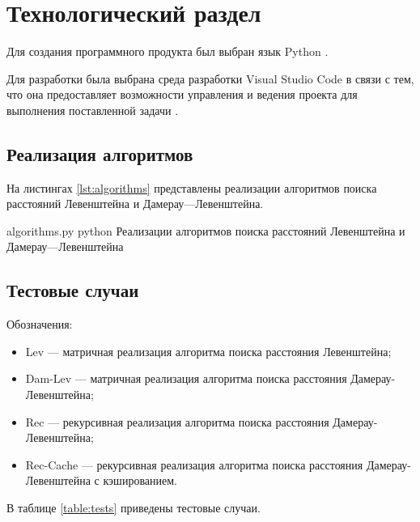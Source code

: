 \chapter{Технологический раздел}

Для создания программного продукта был выбран язык Python \cite{python}.

Для разработки была выбрана среда разработки Visual Studio Code в связи с тем, что она предоставляет возможности управления и ведения проекта для выполнения поставленной задачи \cite{vscode}.

\section{Реализация алгоритмов}

На листингах \ref{lst:algorithms} представлены реализации алгоритмов поиска расстояний Левенштейна и Дамерау---Левенштейна.

\newpage

{
    {algorithms.py}
    {python}
    {Реализации алгоритмов поиска расстояний Левенштейна и Дамерау---Левенштейна}
    \label{lst:algorithms}}

\newpage

\section{Тестовые случаи}

Обозначения:
\begin{itemize}
	\item Lev --- матричная реализация алгоритма поиска расстояния Левенштейна;
	\item Dam-Lev --- матричная реализация алгоритма поиска расстояния Дамерау-Левенштейна;
	\item Rec --- рекурсивная реализация алгоритма поиска расстояния Дамерау-Левенштейна;
	\item Rec-Cache --- рекурсивная реализация алгоритма поиска расстояния Дамерау-Левенштейна с кэшированием.
\end{itemize}

В таблице \ref{table:tests} приведены тестовые случаи.

